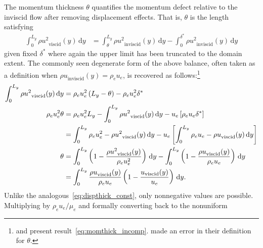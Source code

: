 The momentum thickness $\theta$ quantifies the momentum defect relative to the
inviscid flow after removing displacement effects.  That is, $\theta$ is the
length satisfying
\begin{align}
    \int_0^{L_y} {\rho u^2}_\text{viscid} (y) \, \mathrm{d}y
&=
    \int_{\theta}^{L_y}  {\rho u^2}_\text{inviscid} (y) \, \mathrm{d}y
  - \int_0^{\delta^\ast} {\rho u^2}_\text{inviscid} (y) \, \mathrm{d}y
    \label{eq:momthick_general}
\end{align}
given fixed $\delta^\ast$ where again the upper limit has been truncated to
the domain extent.
%
The commonly seen degenerate form of the above balance, often taken as a
definition when ${\rho u}_\text{inviscid} (y) = \rho_e u_e$, is recovered as
follows:\footnote{%
    \citet[page 214]{Smits2005Turbulent} and \citet[page
    324]{LiepmannRoshko2002} present result~\eqref{eq:momthick_incomp}.
    \citet[Equation 10.95]{Schlichting2000Boundary} made an
    error in their definition for $\theta$.
}
\begin{align}
    \int_0^{L_y} {\rho u^2}_\text{viscid} (y) \, \mathrm{d}y
&=
    \rho_e u_e^2 \left(L_y - \theta\right)
  - \rho_e u_e^2 \delta^\ast
\notag\\
    \rho_e u_e^2 \theta
&=
    \rho_e u_e^2 L_y
  - \int_0^{L_y} {\rho u^2}_\text{viscid} (y) \, \mathrm{d}y
  - u_e \left[\rho_e u_e \delta^\ast\right]
\notag\\
&=
    \int_0^{L_y} \rho_e u_e^2 - {\rho u^2}_\text{viscid} (y) \, \mathrm{d}y
  - u_e \left[
        \int_0^{L_y} \rho_e u_e - {\rho u}_\text{viscid} (y) \, \mathrm{d}y
    \right]
\notag\\
    \theta
&=
    \int_0^{L_y}
        \left(1 - \frac{{\rho u^2}_\text{viscid} (y)}{\rho_e u_e^2}
    \right)  \, \mathrm{d}y
  - \int_0^{L_y}
        \left(1 - \frac{{\rho u}_\text{viscid} (y)}{\rho_e u_e}
    \right)  \, \mathrm{d}y
\notag\\
&=
    \int_0^{L_y} \frac{{\rho u}_\text{viscid} (y)}{\rho_e u_e} \left(
        1 - \frac{{u}_\text{viscid} (y)}{u_e}
    \right)  \, \mathrm{d}y
    \label{eq:momthick_incomp}.
\end{align}
Unlike the analogous~\eqref{eq:dispthick_const}, only nonnegative values
are possible.
%
%
Multiplying by $\rho_e u_e/\mu_e$ and formally converting back to the nonuniform
